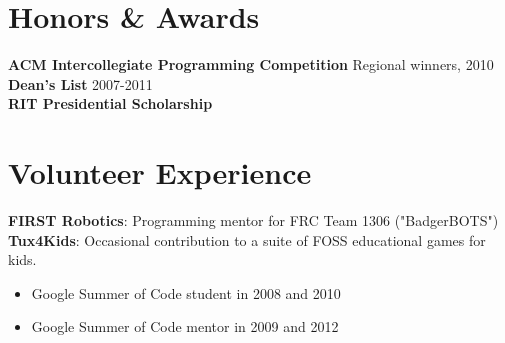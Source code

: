 \documentclass[line,margin]{res}
\begin{document}
\begin{resume}
\section{\sc Honors \& Awards}          
    \textbf{ACM Intercollegiate Programming Competition} \hfill Regional winners, 2010              \\
    \textbf{Dean's List} \hfill                                              2007-2011              \\
    \textbf{RIT Presidential Scholarship}                                                           
 
\section{\sc Volunteer Experience}          
    \textbf{FIRST Robotics}: Programming mentor for FRC Team 1306 ("BadgerBOTS") \\
    \textbf{Tux4Kids}: Occasional contribution to a suite of FOSS educational games for kids.
    \begin{itemize} \itemsep -4pt
        \item Google Summer of Code student in 2008 and 2010 
        \item Google Summer of Code mentor in 2009 and 2012
    \end{itemize}

 
\end{resume}
\end{document}
